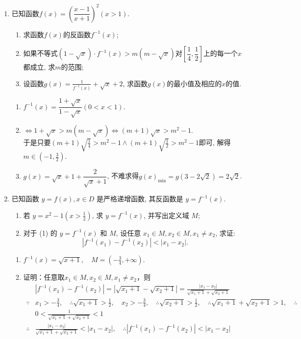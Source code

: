 \begin{enumerate}
\item 已知函数$f(x)=\left(\dfrac{x-1}{x+1}\right)^2(x>1)$. 
\begin{enumerate}[(1)]
\item 求函数$f(x)$的反函数$f^{-1}(x)$; 
\item 如果不等式$(1-\sqrt{x})\cdot f^{-1}(x)>m(m-\sqrt{x})$对$\left[\dfrac{1}{4},\dfrac{1}{2}\right]$上的每一个$x$都成立, 求$m$的范围;
\item 设函数$g(x)=\frac{1}{f^{-1}(x)}+\sqrt{x}+2$, 求函数$g(x)$的最小值及相应的$x$的值.
\end{enumerate}
\begin{jieda}
\begin{enumerate}[(1)]
\item $f^{-1}(x)=\dfrac{1+\sqrt{x}}{1-\sqrt{x}}(0<x<1)$. 

\item $\iff 1+\sqrt{x}>m(m-\sqrt{x})\iff(m+1)\sqrt{x}>m^2-1$. \\
于是只要$(m+1)\sqrt{\frac{1}{4}}>m^2-1\land(m+1)\sqrt{\frac{1}{2}}>m^2-1$即可, 解得$m\in(-1,\frac{3}{2})$. 

\item $g(x)=\sqrt{x}+1+\dfrac{2}{\sqrt{x}+1}$, 不难求得$g(x)_{\min}=g(3-2\sqrt{2})=2\sqrt{2}$. 
\end{enumerate}
\end{jieda}


\item 已知函数 $y=f(x), x \in D$ 是严格递增函数, 其反函数是 $y=f^{-1}(x)$.
\begin{enumerate}
\item 若 $y=x^2-1\left(x>\frac{1}{2}\right)$, 求 $y=f^{-1}(x)$, 并写出定义域 $M$;
\item 对于 (1) 的 $y=f^{-1}(x)$ 和 $M$, 设任意 $x_1 \in M, x_2 \in M, x_1 \neq x_2$, 求证:
$$
\left|f^{-1}\left(x_1\right)-f^{-1}\left(x_2\right)\right|<\left|x_1-x_2\right| .
$$
\end{enumerate}
\begin{jieda}
\begin{enumerate}
\item $f^{-1}(x)=\sqrt{x+1}, \quad M=\left(-\frac{3}{4},+\infty\right)$.
\item 证明：任意取$x_1 \in M, x_2 \in M, x_1 \neq x_2$，则
$$
\begin{aligned}
& \left|f^{-1}\left(x_1\right)-f^{-1}\left(x_2\right)\right|=\left|\sqrt{x_1+1}-\sqrt{x_2+1}\right|=\frac{\left|x_1-x_2\right|}{\sqrt{x_1+1}+\sqrt{x_2+1}} \\
\because & x_1>-\frac{3}{4}, \quad \therefore \sqrt{x_1+1}>\frac{1}{2}, \quad x_2>-\frac{3}{4}, \quad \therefore \sqrt{x_2+1}>\frac{1}{2}, \quad \therefore \sqrt{x_1+1}+\sqrt{x_2+1}>1, \quad \therefore \\
& 0<\frac{1}{\sqrt{x_1+1}+\sqrt{x_2+1}}<1 \\
\therefore & \frac{\left|x_1-x_2\right|}{\sqrt{x_1+1}+\sqrt{x_2+1}}<\left|x_1-x_2\right|, \quad \therefore\left|f^{-1}\left(x_1\right)-f^{-1}\left(x_2\right)\right|<\left|x_1-x_2\right|
\end{aligned}
$$
\end{enumerate}


\end{jieda}
\end{enumerate}
